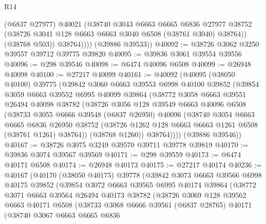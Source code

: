 \begin{lexlean}{R14}
\begin{coremodule}
                (@6837 @27977)
                @40021
                (@38740
                  @3043
                  @6663
                  @6665
                  @6836
                  @27977
                  @38752
                  (@38726 @3041 @128 @6663 @6663 @3040 @6508 (@38761 @3040) @38764))
                (@38768 @503))
              @38764))))
      (@39886 @39533))
@40092 := @38726 @3062 @3250 @39557 @39712 @39775 @39820
@40095 := @39836 @3061 @39554 @39556
@40096 := @298 @39546
@40098 := @6474 @40096 @6508
@40099 := @26948 @40098
@40100 := @27217 @40099
@40161 := @40092
    (@40095
      (@38050 @40100)
      @39775
      (@39842
        @3060
        @6663
        @39553
        @6998
        @40100
        @39852
        (@39854
          @3059
          @6663
          @39552
          @6995
          @40099
          @39864
          (@38772
            @3058
            @6663
            @39551
            @26494
            @40098
            @38782
            (@38726
              @3056
              @128
              @39549
              @6663
              @40096
              @6508
              (@38733
                @3055
                @6666
                @39548
                (@6837 @26950)
                @40096
                (@38740
                  @3054
                  @6663
                  @6665
                  @6836
                  @26950
                  @38752
                  (@38726 @1262 @128 @6663 @6663 @1261 @6508 (@38761 @1261) @38764))
                (@38768 @1260))
              @38764))))
      (@39886 @39546))
@40167 := @38726 @3075 @3249 @39570 @39711 @39778 @39819
@40170 := @39836 @3074 @39567 @39569
@40171 := @298 @39559
@40173 := @6474 @40171 @6508
@40174 := @26948 @40173
@40175 := @27217 @40174
@40236 := @40167
    (@40170
      (@38050 @40175)
      @39778
      (@39842
        @3073
        @6663
        @39566
        @6998
        @40175
        @39852
        (@39854
          @3072
          @6663
          @39565
          @6995
          @40174
          @39864
          (@38772
            @3071
            @6663
            @39564
            @26494
            @40173
            @38782
            (@38726
              @3069
              @128
              @39562
              @6663
              @40171
              @6508
              (@38733
                @3068
                @6666
                @39561
                (@6837 @28765)
                @40171
                (@38740
                  @3067
                  @6663
                  @6665
                  @6836

\end{coremodule}
\end{lexlean}
